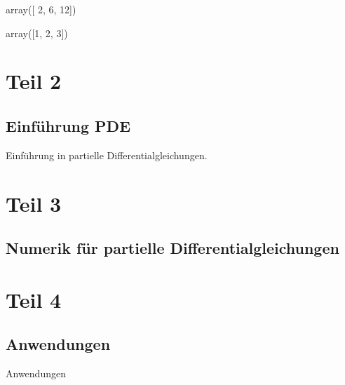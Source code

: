 \documentclass[letterpaper,10pt,english]{jupyterBook}
\begin{document}
\begin{sphinxVerbatim}[commandchars=\\\{\}]
\end{sphinxVerbatim}

\begin{sphinxVerbatim}[commandchars=\\\{\}]
array([ 2,  6, 12])
\end{sphinxVerbatim}

\begin{sphinxVerbatim}[commandchars=\\\{\}]
\end{sphinxVerbatim}

\begin{sphinxVerbatim}[commandchars=\\\{\}]
array([1, 2, 3])
\end{sphinxVerbatim}


\part{Teil 2}


\chapter{Einführung PDE}
\label{\detokenize{PDE/IntroPDE:einfuhrung-pde}}\label{\detokenize{PDE/IntroPDE::doc}}
Einführung in partielle Differentialgleichungen.


\part{Teil 3}


\chapter{Numerik für partielle Differentialgleichungen}
\label{\detokenize{NumerikPDE/NumerikPDE:numerik-fur-partielle-differentialgleichungen}}\label{\detokenize{NumerikPDE/NumerikPDE::doc}}

\part{Teil 4}


\chapter{Anwendungen}
\label{\detokenize{Applications/Applications:anwendungen}}\label{\detokenize{Applications/Applications::doc}}
Anwendungen







\renewcommand{\indexname}{Index}
\printindex
\end{document}
